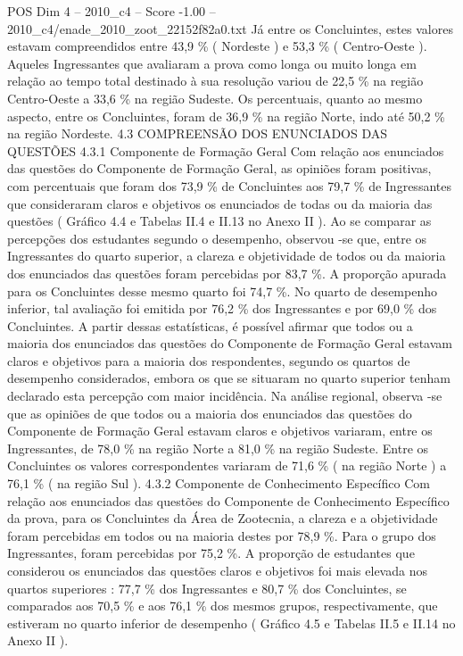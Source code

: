 \begin{textsample}{POS Dim 4 – 2010\_c4 – Score -1.00 – 2010\_c4/enade\_2010\_zoot\_22152f82a0.txt}
Já entre os Concluintes, estes valores estavam compreendidos entre 43,9 \% ( Nordeste ) e 53,3 \% ( Centro-Oeste ).
Aqueles Ingressantes que avaliaram a prova como longa ou muito longa em relação ao tempo total destinado à sua resolução variou de 22,5 \% na região Centro-Oeste a 33,6 \% na região Sudeste.
Os percentuais, quanto ao mesmo aspecto, entre os Concluintes, foram de 36,9 \% na região Norte, indo até 50,2 \% na região Nordeste. 4.3 COMPREENSÃO DOS ENUNCIADOS DAS QUESTÕES 4.3.1 Componente de Formação Geral Com relação aos enunciados das questões do Componente de Formação Geral, as opiniões foram positivas, com percentuais que foram dos 73,9 \% de Concluintes aos 79,7 \% de Ingressantes que consideraram claros e objetivos os enunciados de todas ou da maioria das questões ( Gráfico 4.4 e Tabelas II.4 e II.13 no Anexo II ).
Ao se comparar as percepções dos estudantes segundo o desempenho, observou -se que, entre os Ingressantes do quarto superior, a clareza e objetividade de todos ou da maioria dos enunciados das questões foram percebidas por 83,7 \%.
A proporção apurada para os Concluintes desse mesmo quarto foi 74,7 \%.
No quarto de desempenho inferior, tal avaliação foi emitida por 76,2 \% dos Ingressantes e por 69,0 \% dos Concluintes.
A partir dessas estatísticas, é possível afirmar que todos ou a maioria dos enunciados das questões do Componente de Formação Geral estavam claros e objetivos para a maioria dos respondentes, segundo os quartos de desempenho considerados, embora os que se situaram no quarto superior tenham declarado esta percepção com maior incidência.
Na análise regional, observa -se que as opiniões de que todos ou a maioria dos enunciados das questões do Componente de Formação Geral estavam claros e objetivos variaram, entre os Ingressantes, de 78,0 \% na região Norte a 81,0 \% na região Sudeste.
Entre os Concluintes os valores correspondentes variaram de 71,6 \% ( na região Norte ) a 76,1 \% ( na região Sul ). 4.3.2 Componente de Conhecimento Específico Com relação aos enunciados das questões do Componente de Conhecimento Específico da prova, para os Concluintes da Área de Zootecnia, a clareza e a objetividade foram percebidas em todos ou na maioria destes por 78,9 \%.
Para o grupo dos Ingressantes, foram percebidas por 75,2 \%.
A proporção de estudantes que considerou os enunciados das questões claros e objetivos foi mais elevada nos quartos superiores : 77,7 \% dos Ingressantes e 80,7 \% dos Concluintes, se comparados aos 70,5 \% e aos 76,1 \% dos mesmos grupos, respectivamente, que estiveram no quarto inferior de desempenho ( Gráfico 4.5 e Tabelas II.5 e II.14 no Anexo II ).

\end{textsample}
